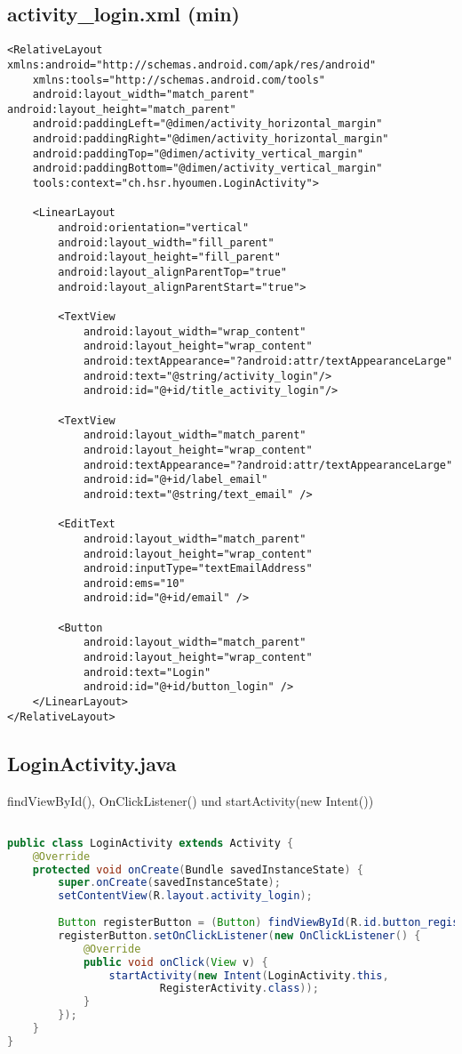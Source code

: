 \documentclass{report}
\begin{document}
\subsection*{activity\_login.xml (min)}
\begin{lstlisting}
<RelativeLayout xmlns:android="http://schemas.android.com/apk/res/android" 
	xmlns:tools="http://schemas.android.com/tools" 
	android:layout_width="match_parent" android:layout_height="match_parent" 
	android:paddingLeft="@dimen/activity_horizontal_margin" 
	android:paddingRight="@dimen/activity_horizontal_margin"
	android:paddingTop="@dimen/activity_vertical_margin" 
	android:paddingBottom="@dimen/activity_vertical_margin"
	tools:context="ch.hsr.hyoumen.LoginActivity">

	<LinearLayout
		android:orientation="vertical"
		android:layout_width="fill_parent"
		android:layout_height="fill_parent"
		android:layout_alignParentTop="true"
		android:layout_alignParentStart="true">

		<TextView
			android:layout_width="wrap_content"
			android:layout_height="wrap_content"
			android:textAppearance="?android:attr/textAppearanceLarge"
			android:text="@string/activity_login"/>
			android:id="@+id/title_activity_login"/>

		<TextView
			android:layout_width="match_parent"
			android:layout_height="wrap_content"
			android:textAppearance="?android:attr/textAppearanceLarge"
			android:id="@+id/label_email"
			android:text="@string/text_email" />

		<EditText
			android:layout_width="match_parent"
			android:layout_height="wrap_content"
			android:inputType="textEmailAddress"
			android:ems="10"
			android:id="@+id/email" />

		<Button
			android:layout_width="match_parent"
			android:layout_height="wrap_content"
			android:text="Login"
			android:id="@+id/button_login" />
	</LinearLayout>
</RelativeLayout>

\end{lstlisting}
\newpage

\subsection*{LoginActivity.java}
findViewById(), OnClickListener() und startActivity(new Intent())
\begin{lstlisting}[language=Java]

public class LoginActivity extends Activity {
	@Override
	protected void onCreate(Bundle savedInstanceState) {
		super.onCreate(savedInstanceState);
		setContentView(R.layout.activity_login);
		
		Button registerButton = (Button) findViewById(R.id.button_register);
		registerButton.setOnClickListener(new OnClickListener() {
		    @Override
		    public void onClick(View v) {
		        startActivity(new Intent(LoginActivity.this, 
						RegisterActivity.class));
		    }
		});
	}
}
\end{lstlisting}
\end{document}
